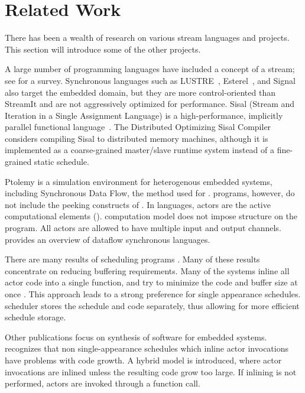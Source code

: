 \section{Related Work}
\label{chpt:related}

There has been a wealth of research on various stream languages
and projects.  This section will introduce some of the other
projects.

A large number of programming languages have included a concept of
a stream; see \cite{survey97} for a survey.  Synchronous languages
such as LUSTRE~\cite{lustre}, Esterel~\cite{esterel92}, and
Signal~\cite{signal} also target the embedded domain, but they are
more control-oriented than StreamIt and are not aggressively
optimized for performance.  Sisal (Stream and Iteration in a
Single Assignment Language) is a high-performance, implicitly
parallel functional language~\cite{sisal}.  The Distributed
Optimizing Sisal Compiler~\cite{sisal} considers compiling Sisal
to distributed memory machines, although it is implemented as a
coarse-grained master/slave runtime system instead of a
fine-grained static schedule.

Ptolemy \cite{ptolemyoverview} is a simulation environment for
heterogenous embedded systems, including Synchronous Data Flow,
the method used for {\StreamIt}. {\SDF} programs, however, do not
include the peeking constructs of {\StreamIt}.  In {\SDF} languages,
actors are the active computational elements ({\filters}).  {\SDF}
computation model does not impose structure on the program.  All
actors are allowed to have multiple input and output channels.
\cite{benveniste93dataflow} provides an overview of dataflow
synchronous languages.

There are many results of scheduling {\SDF} programs
\cite{leesdf}. Many of these results concentrate on reducing
buffering requirements. Many of the systems inline all actor code
into a single function, and try to minimize the code and buffer
size at once \cite{bhattacharyya99synthesis}.  This approach leads
to a strong preference for single appearance schedules.
{\StreamIt} scheduler stores the schedule and {\filter} code
separately, thus allowing for more efficient schedule storage.

Other publications focus on synthesis of software for embedded
systems. \cite{bhat1999x1} recognizes that non single-appearance
schedules which inline actor invocations have problems with code
growth.  A hybrid model is introduced, where actor invocations are
inlined unless the resulting code grow too large. If inlining is
not performed, actors are invoked through a function call.

